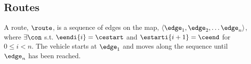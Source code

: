 \begin{comment}
\subsection{Trajectory}
A trajectory is the GPS records of the time and location of a vehicle 
\end{comment}

\subsection{Routes}
A route, $\route$, is a sequence of edges on the map, $\langle \edge_1, \edge_2, \dots \edge_n \rangle$, where $\exists \con$ s.t. $\eendi{i} = \cestart$ and $\estarti{i+1} = \ceend$ for $0\leq i< n$.
The vehicle starts at $\edge_1$ and moves along the sequence until $\edge_n$ has been reached.


